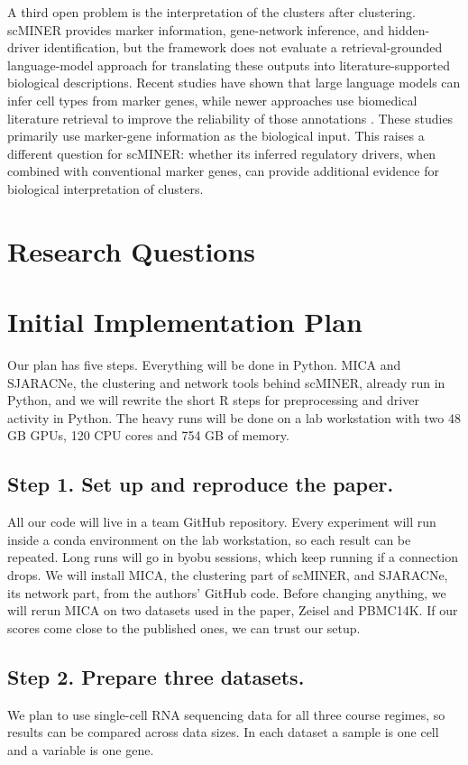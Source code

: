 \documentclass[conference]{IEEEtran}
\begin{document}
A third open problem is the interpretation of the clusters after clustering. scMINER provides marker information, gene-network inference, and hidden-driver identification, but the framework does not evaluate a retrieval-grounded language-model approach for translating these outputs into literature-supported biological descriptions. Recent studies have shown that large language models can infer cell types from marker genes, while newer approaches use biomedical literature retrieval to improve the reliability of those annotations \cite{hou2024gpt4,crowley2025anndictionary,kazmi2025beyond,yang2026rag}. These studies primarily use marker-gene information as the biological input. This raises a different question for scMINER: whether its inferred regulatory drivers, when combined with conventional marker genes, can provide additional evidence for biological interpretation of clusters.
\section{Research Questions}

\section{Initial Implementation Plan}
Our plan has five steps. Everything will be done in Python. MICA and SJARACNe, the clustering and network tools behind scMINER, already run in Python, and we will rewrite the short R steps for preprocessing and driver activity in Python. The heavy runs will be done on a lab workstation with two 48 GB GPUs, 120 CPU cores and 754 GB of memory. 

\subsection{Step 1. Set up and reproduce the paper.}

All our code will live in a team GitHub repository. Every experiment will run inside a conda environment on the lab workstation, so each result can be repeated. Long runs will go in byobu sessions, which keep running if a connection drops. We will install MICA, the clustering part of scMINER, and SJARACNe, its network part, from the authors' GitHub code. Before changing anything, we will rerun MICA on two datasets used in the paper, Zeisel and PBMC14K. If our scores come close to the published ones, we can trust our setup.

\subsection{Step 2. Prepare three datasets.}
We plan to use single-cell RNA sequencing data for all three course regimes, so results can be compared across data sizes. In each dataset a sample is one cell and a variable is one gene. 
\end{document}
